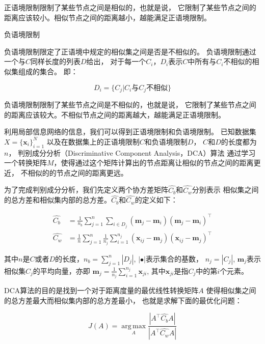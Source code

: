 正语境限制限制了某些节点之间是相似的，也就是说，
它限制了某些节点之间的距离应该较小。相似节点之间的距离越小，越能满足正语境限制。

\begin{defn}{负语境限制}
\label{defn:negconstraints}

    负语境限制限定了正语境中规定的相似集之间是否是不相似的。
    负语境限制通过一个与$C$同样长度的列表$D$给出，
    对于每一个$C_i$，$D_i$表示$C$中所有与$C_i$不相似的相似集组成的集合。
    即：

    $$
    D_i = \{C_j | C_i \text{与} C_j \text{不相似} \}
    $$

\end{defn}

负语境限制限制了某些节点之间是不相似的，也就是说，
它限制了某些节点之间的距离应该较大。不相似节点之间的距离越大，越能满足正语境限制。

利用局部信息网络的信息，我们可以得到正语境限制和负语境限制。
已知数据集
$X = \{ \bm{x}_i \}_{i=1}^{N}$
以及在数据集上的正语境限制$C$和负语境限制$D$，
$C$和$D$的长度都为$n$，
判别成分分析（Discriminative Component Analysis，DCA）算法
通过学习一个转换矩阵$M$，使得通过这个矩阵计算出的节点距离让相似的节点之间的距离更近，
不相似的的节点之间的距离更远。

为了完成判别成分分析，我们先定义两个协方差矩阵$\hat{C_b}$和$\hat{C_w}$分别表示
相似集之间的总方差和相似集内部的总方差。$\hat{C_b}$和$\hat{C_w}$的定义如下：

\begin{align}
    \label{equa:cb}
    \hat{C_b} &= \frac{1}{n_b} \sum_{j=1}^n \sum_{i \in D_j} (\bm{m}_j - \bm{m}_i)(\bm{m}_j - \bm{m}_i)^\top \\
    \label{equa:cw}
    \hat{C_w} &= \frac{1}{n} \sum_{j=1}^n \frac{1}{n_j} \sum_{i = 1}^{n_j} (\bm{x}_{ij} - \bm{m}_j)(\bm{x}_{ij} - \bm{m}_j)^\top
\end{align}

其中$n$是$C$或者$D$的长度，$n_b = \sum_{j=1}^{n}|D_j|$, $|\bullet|$表示集合的基数，
$n_j = |C_j|$,
$\bm{m}_j$表示相似集$C_j$的平均向量，亦即
$\bm{m}_j = \frac{1}{n_j} \sum_{i=1}^{n_j} \bm{x}_{ji}$, 
其中$\bm{x}_{ji}$是指$C_j$中的第$i$个元素。

DCA算法的目的是找到一个对于距离度量的最优线性转换矩阵$A$
使得相似集之间的总方差最大而相似集内部的总方差最小，
也就是求解下面的最优化问题：

\begin{equation}
    \label{equa:dca_opt}
    J(A) = \operatorname*{arg\,max}_A \frac {|A^\top \hat{C_b} A|} {|A^\top \hat{C_w} A|}
\end{equation}

